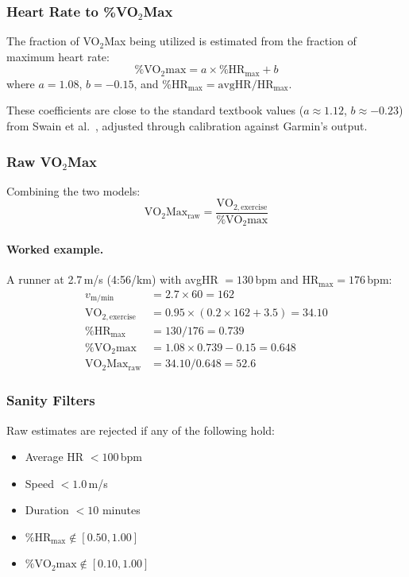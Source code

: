 \documentclass[11pt,a4paper]{article}
\begin{document}
\subsubsection{Heart Rate to \%VO$_2$Max}

The fraction of VO$_2$Max being utilized is estimated from the fraction of maximum heart rate:
\begin{equation}
\%\text{VO}_2\text{max} = a \times \%\text{HR}_{\text{max}} + b
\label{eq:hrmax-model}
\end{equation}
where $a = 1.08$, $b = -0.15$, and $\%\text{HR}_{\text{max}} = \text{avgHR} / \text{HR}_{\text{max}}$.

These coefficients are close to the standard textbook values ($a \approx 1.12$, $b \approx -0.23$) from Swain et al.~\cite{swain1994}, adjusted through calibration against Garmin's output.

\subsubsection{Raw VO$_2$Max}

Combining the two models:
\begin{equation}
\text{VO}_2\text{Max}_{\text{raw}} = \frac{\text{VO}_{2,\text{exercise}}}{\%\text{VO}_2\text{max}}
\label{eq:raw-vo2max}
\end{equation}

\paragraph{Worked example.}
A runner at 2.7\,m/s (4:56/km) with avgHR $= 130$\,bpm and HR$_{\text{max}} = 176$\,bpm:
\begin{align*}
v_{\text{m/min}} &= 2.7 \times 60 = 162 \\
\text{VO}_{2,\text{exercise}} &= 0.95 \times (0.2 \times 162 + 3.5) = 34.10 \\
\%\text{HR}_{\text{max}} &= 130 / 176 = 0.739 \\
\%\text{VO}_2\text{max} &= 1.08 \times 0.739 - 0.15 = 0.648 \\
\text{VO}_2\text{Max}_{\text{raw}} &= 34.10 / 0.648 = 52.6
\end{align*}

\subsubsection{Sanity Filters}

Raw estimates are rejected if any of the following hold:
\begin{itemize}[nosep]
    \item Average HR $< 100$\,bpm
    \item Speed $< 1.0$\,m/s
    \item Duration $< 10$ minutes
    \item $\%\text{HR}_{\text{max}} \notin [0.50, 1.00]$
    \item $\%\text{VO}_2\text{max} \notin [0.10, 1.00]$
\end{itemize}
\end{document}
